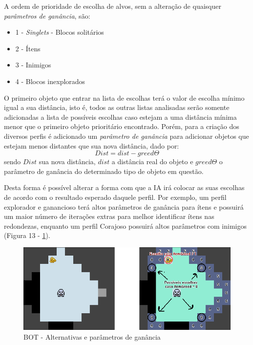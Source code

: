 A ordem de prioridade de escolha de alvos, sem a alteração de quaisquer \textit{parâmetros de ganância}, são:
\begin{itemize}
	\item 1 - \textit{Singlets} - Blocos solitários
	\item 2 - Ítens 
	\item 3 - Inimigos
	\item 4 - Blocos inexplorados
\end{itemize}

O primeiro objeto que entrar na lista de escolhas terá o valor de escolha mínimo igual a sua distância, isto é, todos as outras listas analisadas serão somente adicionadas a lista de possíveis escolhas caso estejam a uma distância mínima menor que o primeiro objeto prioritário encontrado. Porém, para a criação dos diversos perfis é adicionado um \textit{parâmetro de ganância} para adicionar objetos que estejam menos distantes que sua nova distância, dado por:
\begin{equation}
\label{eqn01}
	Dist = dist - greed\Theta
\end{equation}
sendo $Dist$ sua nova distância, $dist$ a distância real do objeto e $greed\Theta$ o parâmetro de ganância do determinado tipo de objeto em questão.

Desta forma é possível alterar a forma com que a IA irá colocar as suas escolhas de acordo com o resultado esperado daquele perfil. Por exemplo, um perfil explorador e ganancioso terá altos parâmetros de ganância para ítens e possuirá um maior número de iterações extras para melhor identificar ítens nas redondezas, enquanto um perfil Corajoso possuirá altos parâmetros com inimigos (Figura 13 - \ref{fig13}).

\begin{figure}[h]
	\centering
	\label{fig13}
		\includegraphics[keepaspectratio=true,scale=0.5]{figuras/fig13-bot2.png}
	\caption{BOT - Alternativas e parâmetros de ganância}
\end{figure}


